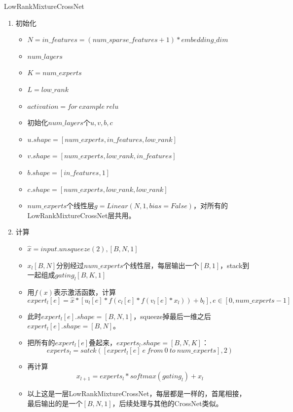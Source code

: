 \documentclass{article}
\begin{document}
LowRankMixtureCrossNet
\begin{enumerate}
    \item 初始化
    \begin{itemize}
        \item $N=in\_features = (num\_sparse\_features + 1) * embedding\_dim$
        \item $num\_layers$
        \item $K=num\_experts$
        \item $L=low\_rank$
        \item $activation=for\ example\ relu$
        \item 初始化$num\_layers$个$u,v,b,c$
        \item $u.shape = [num\_experts, in\_features, low\_rank]$
        \item $v.shape = [num\_experts, low\_rank, in\_features]$
        \item $b.shape = [in\_features, 1]$
        \item $c.shape = [num\_experts, low\_rank, low\_rank]$
        \item $num\_experts$个线性层$g = Linear(N, 1, bias=False)$，对所有的LowRankMixtureCrossNet层共用。
    \end{itemize}
    \item 计算 
    \begin{itemize}
        \item $\hat{x}=input.unsqueeze(2), [B,N,1]$
        \item $x_l[B,N]$分别经过$num\_experts$个线性层，每层输出一个$[B,1]$，stack到一起组成$gating_l[B,K,1]$
        \item 用$f(x)$表示激活函数，计算
        $$
        expert_l[e] = \hat{x} \ast 
            \left[u_l[e] \ast f\left(c_l[e] \ast f\left(v_l[e]\ast x_l\right)\right) + b_l\right],
            e\in [0, num\_experts-1]
        $$
        \item 此时$expert_l[e].shape = [B,N,1]$，squeeze掉最后一维之后$expert_l[e].shape = [B,N]$。
        \item 把所有的$expert_l[e]$叠起来，$experts_l.shape=[B,N,K]$：$$experts_l = satck([expert_l[e]\ e\ from\ 0\ to\ num\_experts], 2)$$
        \item 再计算$$x_{l+1} = experts_l \ast softmax(gating_l) + x_l$$
        \item 以上这是一层LowRankMixtureCrossNet，每层都是一样的，首尾相接，最后输出的是一个$[B,N,1]$，后续处理与其他的CrossNet类似。
    \end{itemize}
\end{enumerate}
\end{document}
